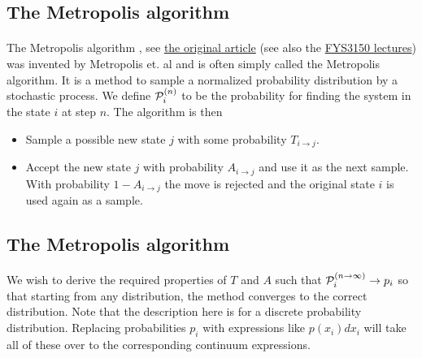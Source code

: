 \documentclass[%
twoside,                 %
final,                   %
10pt]{article}
\begin{document}
\noindent




\subsection*{The Metropolis algorithm}

\paragraph{}
The Metropolis algorithm , see \href{{http://scitation.aip.org/content/aip/journal/jcp/21/6/10.1063/1.1699114}}{the original article}  (see also the \href{{http://www.uio.no/studier/emner/matnat/fys/FYS3150/h14/index.html}}{FYS3150 lectures})
was invented by Metropolis et. al
and is often simply called the Metropolis algorithm.
It is a method to sample a normalized probability
distribution by a stochastic process. We define ${\cal P}_i^{(n)}$ to
be the probability for finding the system in the state $i$ at step $n$.
The algorithm is then

\begin{itemize}
\item Sample a possible new state $j$ with some probability $T_{i\rightarrow j}$.

\item Accept the new state $j$ with probability $A_{i \rightarrow j}$ and use it as the next sample. With probability $1-A_{i\rightarrow j}$ the move is rejected and the original state $i$ is used again as a sample.
\end{itemize}

\noindent




\subsection*{The Metropolis algorithm}

\paragraph{}
We wish to derive the required properties of $T$ and $A$ such that
${\cal P}_i^{(n\rightarrow \infty)} \rightarrow p_i$ so that starting
from any distribution, the method converges to the correct distribution.
Note that the description here is for a discrete probability distribution.
Replacing probabilities $p_i$ with expressions like $p(x_i)dx_i$ will
take all of these over to the corresponding continuum expressions.
\end{document}
